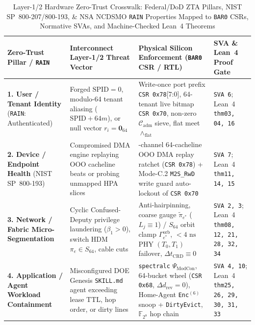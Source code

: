 \documentclass[11pt,letterpaper]{article}
\renewcommand{\arraystretch}{1.22}
\theoremstyle{spectralthm}
\begin{document}
\begin{table}[!tp]
\centering
\footnotesize
\setlength{\tabcolsep}{4.5pt}
\renewcommand{\arraystretch}{1.22}
\caption{Layer-1/2 Hardware Zero-Trust Crosswalk: Federal/DoD ZTA Pillars, NIST SP~800-207/800-193, \& NSA NCDSMO \texttt{RAIN} Properties Mapped to \texttt{BAR0} CSRs, Normative SVAs, and Machine-Checked Lean~4 Theorems}
\label{tab:zta_crosswalk}
\begin{tabularx}{\textwidth}{@{}>{\raggedright\hyphenpenalty=10000\exhyphenpenalty=10000\arraybackslash}p{3.25cm} >{\raggedright\arraybackslash}p{3.95cm} >{\raggedright\arraybackslash}X >{\raggedright\arraybackslash}p{4.20cm}@{}}
\toprule
\textbf{Zero-Trust Pillar / \texttt{RAIN}} & \textbf{Interconnect Layer-1/2 Threat Vector} & \textbf{Physical Silicon Enforcement (\texttt{BAR0} CSR / RTL)} & \textbf{SVA \& Lean~4 Proof Gate} \\
\midrule
\textbf{1. User / Tenant Identity} (\texttt{RAIN}: Authenticated) & Forged $\mathrm{SPID}=0$, modulo-64 tenant aliasing ($\mathrm{SPID}+64m$), or null vector $r_i=\mathbf{0}_{64}$ & Write-once port prefix \texttt{CSR 0x78}[7:0], 64-tenant live bitmap \texttt{CSR 0x70}, non-zero $\mathcal{C}_{\mathrm{adm}}$ sieve, flat meet $\wedge_{\mathrm{flat}}$ & \texttt{SVA 6}; Lean~4 \texttt{thm03, 04, 16} \\
\addlinespace[3pt]
\textbf{2. Device / Endpoint Health} (NIST SP~800-193) & Compromised DMA engine replaying OOO cacheline beats or probing unmapped HPA slices & 4-channel 64-cacheline OOO DMA replay ratchet (\texttt{CSR 0x78}) + Mode-C.2 \texttt{M2S\_RwD} write guard auto-lockout of \texttt{CSR 0x70} & \texttt{SVA 7}; Lean~4 \texttt{thm11, 14, 15} \\
\addlinespace[3pt]
\textbf{3. Network / Fabric \mbox{Micro-Segmentation}} & Cyclic Confused-Deputy privilege laundering ($\beta_1 > 0$), switch HDM $\pi_e \in S_{64}$, cable cuts & Anti-hairpinning, coarse gauge $\widetilde{\pi}_{e^*}$ ($L_j\equiv 1$) / $S_{64}$ orbit clamp $\Gamma_{e^*}^{\mathrm{orb}}$, $<4\text{~ns}$ PHY $(T_0,T_1)$ failover, $\Delta t_{\mathrm{CRD}}\equiv 0$ & \texttt{SVA 2, 3}; Lean~4 \texttt{thm08, 12, 21, 28, 32, 34} \\
\addlinespace[3pt]
\textbf{4. Application / Agent Workload Containment} & Misconfigured DOE Genesis \texttt{SKILL.md} agent exceeding lease TTL, hop order, or dirty lines & \texttt{spectralc} $\Psi_{\mathrm{ModCon}}$, 64-bucket wheel (\texttt{CSR 0x68}, $\Delta d_{\mathrm{rev}}=0$), Home-Agent \texttt{Enc}$^{(6)}$ snoop + \texttt{DirtyEvict}, $\mathbb{F}_{2^8}$ hop chain & \texttt{SVA 4, 10}; Lean~4 \texttt{thm25, 26, 29, 30, 31, 33} \\

\end{tabularx}
\end{table}
\end{document}
